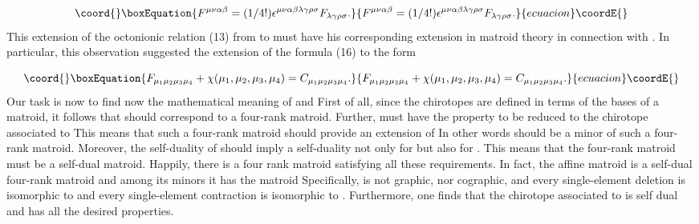 \documentclass[a4paper,12pt]{article}
\begin{document}
\begin{equation}\coord{}\boxEquation{
F^{\mu \nu \alpha \beta }=(1/4!)\epsilon ^{\mu \nu \alpha \beta \lambda
\gamma \rho \sigma }F_{\lambda \gamma \rho \sigma }.  \label{21}
}{
F^{\mu \nu \alpha \beta }=(1/4!)\epsilon ^{\mu \nu \alpha \beta \lambda
\gamma \rho \sigma }F_{\lambda \gamma \rho \sigma }.  }{ecuacion}\coordE{}\end{equation}
This extension of the octonionic relation (13) from \coordHE{} to \coordHE{} must have
his corresponding extension in matroid theory in connection with \coordHE{}. In
particular, this observation suggested the extension of the formula (16) to
the form

\begin{equation}\coord{}\boxEquation{
F_{\mu _{1}\mu _{2}\mu _{3}\mu _{4}}+\chi (\mu _{1},\mu _{2},\mu _{3},\mu
_{4})=C_{\mu _{1}\mu _{2}\mu _{3}\mu _{4}}.  \label{22}
}{
F_{\mu _{1}\mu _{2}\mu _{3}\mu _{4}}+\chi (\mu _{1},\mu _{2},\mu _{3},\mu
_{4})=C_{\mu _{1}\mu _{2}\mu _{3}\mu _{4}}.  }{ecuacion}\coordE{}\end{equation}
Our task is now to find now the mathematical meaning of \coordHE{} and \coordHE{} First
of all, since the chirotopes are defined in terms of the bases of a matroid,
it follows that \coordHE{} should
correspond to a four-rank matroid. Further, \coordHE{} must have the property to be reduced to the chirotope \coordHE{} associated to \coordHE{} This means that such a four-rank
matroid should provide an extension of \coordHE{} In other words \coordHE{}
should be a minor of such a four-rank matroid. Moreover, the self-duality of 
\coordHE{} should imply a self-duality not only
for \coordHE{} but also for \coordHE{}. This means that the four-rank matroid must
be a self-dual matroid. Happily, there is a four rank matroid satisfying all
these requirements. In fact, the affine matroid \coordHE{} is a self-dual
four-rank matroid and among its minors it has the matroid \coordHE{}
Specifically, \coordHE{} is not graphic, nor cographic, and every
single-element deletion is isomorphic to \coordHE{} and every
single-element contraction is isomorphic to \coordHE{}. Furthermore, one finds
that the chirotope \coordHE{} associated
to \coordHE{} is self dual and has all the desired properties.
\end{document}
